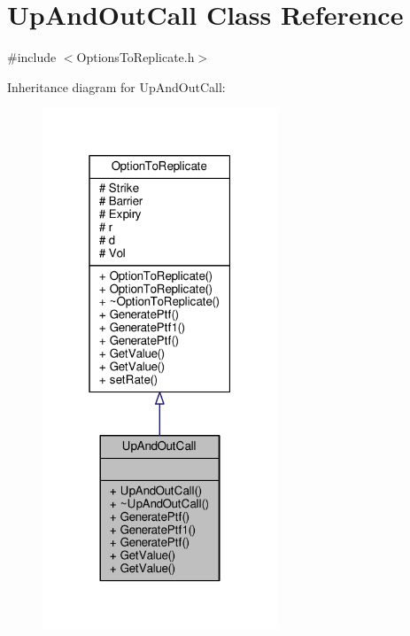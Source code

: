 \hypertarget{classUpAndOutCall}{}\section{Up\+And\+Out\+Call Class Reference}
\label{classUpAndOutCall}


{\ttfamily \#include $<$Options\+To\+Replicate.\+h$>$}



Inheritance diagram for Up\+And\+Out\+Call\+:
\nopagebreak
\begin{figure}[H]
\begin{center}
\leavevmode
\includegraphics[width=199pt]{classUpAndOutCall__inherit__graph}
\end{center}
\end{figure}


